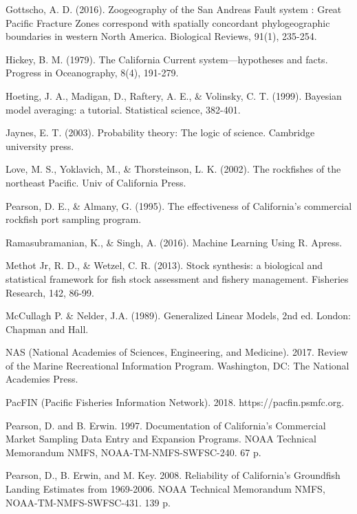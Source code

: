\documentclass[12pt]{article}
\begin{document}
\begin{thebibliography}{1}
%
 Gottscho, A. D. (2016). Zoogeography of the San Andreas Fault system
: Great Pacific Fracture Zones correspond with spatially concordant 
phylogeographic boundaries in western North America. Biological Reviews, 91(1), 
235-254.

%
 Hickey, B. M. (1979). The California Current 
system—hypotheses and facts. Progress in Oceanography, 8(4), 191-279.

%
 Hoeting, J. A., Madigan, D., Raftery, A. E., \& Volinsky, C. T. 
(1999). Bayesian model averaging: a tutorial. Statistical science, 382-401.

%
 Jaynes, E. T. (2003). Probability theory: The logic of 
science. Cambridge university press.

%
 Love, M. S., Yoklavich, M., \& Thorsteinson, L. K. (2002). The 
rockfishes of the northeast Pacific. Univ of California Press.

%
 Pearson, D. E., \& Almany, G. (1995). The effectiveness of 
California's commercial rockfish port sampling program.

%
 Ramasubramanian, K., \& Singh, A. (2016). Machine Learning 
Using R. Apress.

%
 Methot Jr, R. D., \& Wetzel, C. R. (2013). Stock synthesis: a 
biological and statistical framework for fish stock assessment and fishery 
management.  Fisheries Research, 142, 86-99.

%
 McCullagh P. \& Nelder, J.A. (1989). Generalized Linear 
Models, 2nd ed. London: Chapman and Hall.

%
 NAS (National Academies of Sciences, Engineering, and Medicine). 
2017. Review of the Marine Recreational Information Program. Washington, DC: 
The National Academies Press.

%
 PacFIN (Pacific Fisheries Information Network). 2018. 
https://pacfin.psmfc.org.

%
 Pearson, D. and B. Erwin. 1997. Documentation of 
California's Commercial Market Sampling Data Entry and Expansion Programs. 
NOAA Technical Memorandum NMFS, NOAA-TM-NMFS-SWFSC-240. 67 p.

%
Pearson, D., B. Erwin, and M. Key. 2008. Reliability 
of California's Groundfish Landing Estimates from 1969-2006. NOAA Technical 
Memorandum NMFS, NOAA-TM-NMFS-SWFSC-431. 139 p.


\end{thebibliography}
\end{document}
